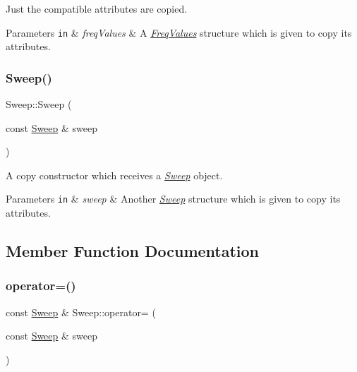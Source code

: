 Just the compatible attributes are copied. 
\begin{DoxyParams}[1]{Parameters}
\mbox{\tt in}  & {\em freq\+Values} & A {\itshape \hyperlink{structFreqValues}{Freq\+Values}} structure which is given to copy its attributes. \\
\hline
\end{DoxyParams}
\mbox{\label{structSweep_a0a4e0f72fe9051d35cb29953005463b3}} 
\subsubsection{\texorpdfstring{Sweep()}{Sweep()}\hspace{0.1cm}{\footnotesize\ttfamily [2/2]}}
{\footnotesize\ttfamily Sweep\+::\+Sweep (\begin{DoxyParamCaption}\item[{const \hyperlink{structSweep}{Sweep} \&}]{sweep }\end{DoxyParamCaption})\hspace{0.3cm}{\ttfamily [inline]}}



A copy constructor which receives a {\itshape \hyperlink{structSweep}{Sweep}} object. 


\begin{DoxyParams}[1]{Parameters}
\mbox{\tt in}  & {\em sweep} & Another {\itshape \hyperlink{structSweep}{Sweep}} structure which is given to copy its attributes. \\
\hline
\end{DoxyParams}


\subsection{Member Function Documentation}
\mbox{\label{structSweep_a0cd5bc95e0e71b06887de9de4ea5ee6a}} 
\subsubsection{\texorpdfstring{operator=()}{operator=()}}
{\footnotesize\ttfamily const \hyperlink{structSweep}{Sweep} \& Sweep\+::operator= (\begin{DoxyParamCaption}\item[{const \hyperlink{structSweep}{Sweep} \&}]{sweep }\end{DoxyParamCaption})}



